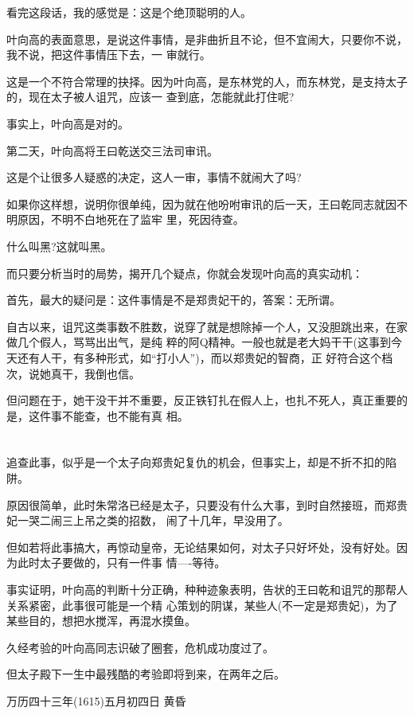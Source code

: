 \documentclass[11pt,a4paper,onecolumn]{article}
\begin{document}
看完这段话，我的感觉是：这是个绝顶聪明的人。

叶向高的表面意思，是说这件事情，是非曲折且不论，但不宜闹大，只要你不说，我不说，把这件事情压下去，一
审就行。

这是一个不符合常理的抉择。因为叶向高，是东林党的人，而东林党，是支持太子的，现在太子被人诅咒，应该一
查到底，怎能就此打住呢?

事实上，叶向高是对的。

第二天，叶向高将王曰乾送交三法司审讯。

这是个让很多人疑惑的决定，这人一审，事情不就闹大了吗?

如果你这样想，说明你很单纯，因为就在他吩咐审讯的后一天，王曰乾同志就因不明原因，不明不白地死在了监牢
里，死因待查。

什么叫黑?这就叫黑。

而只要分析当时的局势，揭开几个疑点，你就会发现叶向高的真实动机：

首先，最大的疑问是：这件事情是不是郑贵妃干的，答案：无所谓。

自古以来，诅咒这类事数不胜数，说穿了就是想除掉一个人，又没胆跳出来，在家做几个假人，骂骂出出气，是纯
粹的阿Q精神。一般也就是老大妈干干(这事到今天还有人干，有多种形式，如``打小人'')，而以郑贵妃的智商，正
好符合这个档次，说她真干，我倒也信。

但问题在于，她干没干并不重要，反正铁钉扎在假人上，也扎不死人，真正重要的是，这件事不能查，也不能有真
相。

\section[\thesection]{}

追查此事，似乎是一个太子向郑贵妃复仇的机会，但事实上，却是不折不扣的陷阱。

原因很简单，此时朱常洛已经是太子，只要没有什么大事，到时自然接班，而郑贵妃一哭二闹三上吊之类的招数，
闹了十几年，早没用了。

但如若将此事搞大，再惊动皇帝，无论结果如何，对太子只好坏处，没有好处。因为此时太子要做的，只有一件事
情----等待。

事实证明，叶向高的判断十分正确，种种迹象表明，告状的王曰乾和诅咒的那帮人关系紧密，此事很可能是一个精
心策划的阴谋，某些人(不一定是郑贵妃)，为了某些目的，想把水搅浑，再混水摸鱼。

久经考验的叶向高同志识破了圈套，危机成功度过了。

但太子殿下一生中最残酷的考验即将到来，在两年之后。

万历四十三年(1615)五月初四日 黄昏
\end{document}
